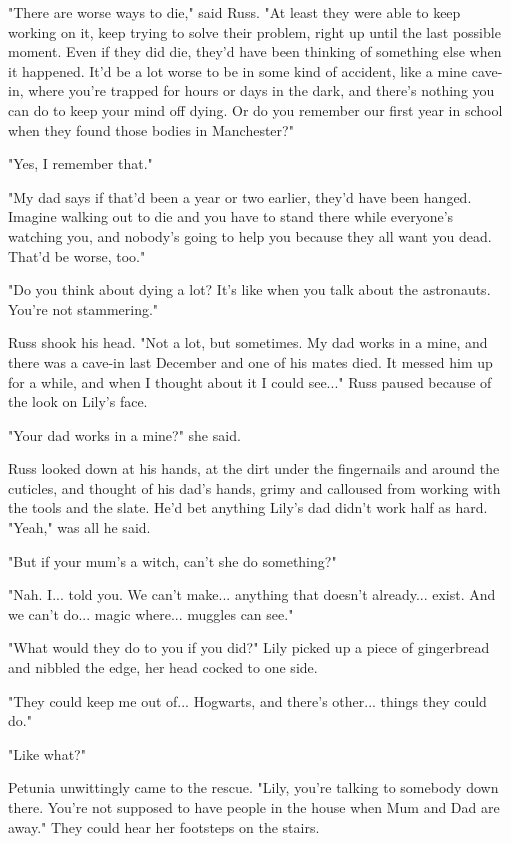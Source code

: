 \documentclass[a4paper,11pt]{article}
\begin{document}
"There are worse ways to die," said Russ. "At least they were able to keep working on it, keep trying to solve their problem, right up until the last possible moment. Even if they did die, they'd have been thinking of something else when it happened. It'd be a lot worse to be in some kind of accident, like a mine cave-in, where you're trapped for hours or days in the dark, and there's nothing you can do to keep your mind off dying. Or do you remember our first year in school when they found those bodies in Manchester?"

"Yes, I remember that."

"My dad says if that'd been a year or two earlier, they'd have been hanged. Imagine walking out to die and you have to stand there while everyone's watching you, and nobody's going to help you because they all want you dead. That'd be worse, too."

"Do you think about dying a lot? It's like when you talk about the astronauts. You're not stammering."

Russ shook his head. "Not a lot, but sometimes. My dad works in a mine, and there was a cave-in last December and one of his mates died. It messed him up for a while, and when I thought about it I could see..." Russ paused because of the look on Lily's face.

"Your dad works in a mine?" she said.

Russ looked down at his hands, at the dirt under the fingernails and around the cuticles, and thought of his dad's hands, grimy and calloused from working with the tools and the slate. He'd bet anything Lily's dad didn't work half as hard. "Yeah," was all he said.

"But if your mum's a witch, can't she do something?"

"Nah. I... told you. We can't make... anything that doesn't already... exist. And we can't do... magic where... muggles can see."

"What would they do to you if you did?" Lily picked up a piece of gingerbread and nibbled the edge, her head cocked to one side.

"They could keep me out of... Hogwarts, and there's other... things they could do."

"Like what?"

Petunia unwittingly came to the rescue. "Lily, you're talking to somebody down there. You're not supposed to have people in the house when Mum and Dad are away." They could hear her footsteps on the stairs.
\end{document}
